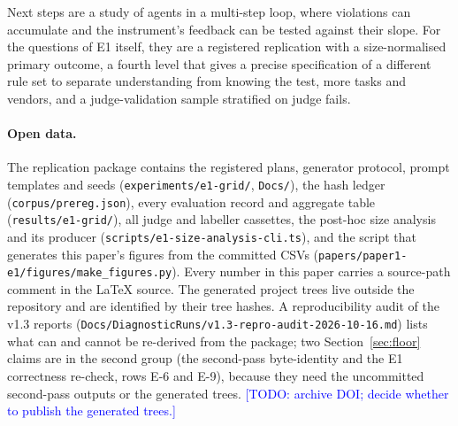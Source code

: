 \documentclass[10pt,a4paper]{article}
\newcommand{\todo}[1]{\textcolor{blue}{[TODO: #1]}}
\begin{document}
Next steps are a study of agents in a multi-step loop, where violations can accumulate and the instrument's feedback
can be tested against their slope. For the questions of E1 itself, they are a registered replication with a size-normalised primary outcome, a fourth level that gives a precise
specification of a different rule set to separate understanding from knowing the test, more tasks and vendors, and a
judge-validation sample stratified on judge fails.

\paragraph{Open data.} The replication package contains the registered plans, generator protocol, prompt templates
and seeds (\texttt{experiments/e1-grid/}, \texttt{Docs/}), the hash ledger (\texttt{corpus/prereg.json}), every
evaluation record and aggregate table (\texttt{results/e1-grid/}), all judge and labeller cassettes, the post-hoc size
analysis and its producer (\texttt{scripts/e1-size-analysis-cli.ts}), and the script that generates this paper's
figures from the committed CSVs (\texttt{papers/paper1-e1/figures/make\_figures.py}). Every number in this paper
carries a source-path comment in the \LaTeX{} source. The generated project trees live outside the repository and are
identified by their tree hashes. A reproducibility audit of the v1.3 reports
(\texttt{Docs/DiagnosticRuns/v1.3-repro-audit-2026-10-16.md}) lists what can and cannot be re-derived from the
package; two Section~\ref{sec:floor} claims are in the second group (the second-pass byte-identity and the E1
correctness re-check, rows E-6 and E-9), because they need the uncommitted second-pass outputs or the generated trees. \todo{archive DOI; decide whether to publish the generated trees.}



\end{document}
